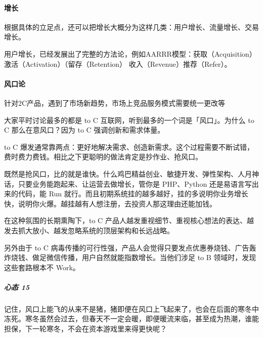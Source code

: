 \documentclass[letterpaper,10pt,english]{sphinxmanual}
\begin{document}
\paragraph{增长}
\label{\detokenize{chapter_introduction/2C:id7}}
根据具体的立足点，还可以把增长大概分为这样几类：用户增长、流量增长、交易增长。

用户增长，已经发展出了完整的方法论，例如AARRR模型：获取（Acquisition）\sphinxhyphen{}
激活（Activation）\sphinxhyphen{}（留存（Retention）\sphinxhyphen{} 收入（Revenue）\sphinxhyphen{}推荐（Refer）。


\paragraph{风口论}
\label{\detokenize{chapter_introduction/2C:id8}}
针对2C产品，遇到了市场新趋势，市场上竞品服务模式需要统一更改等
%
\begin{footnote}[107]\sphinxAtStartFootnote
{}
%
\end{footnote}

大家平时讨论最多的都是 to C 互联网，听到最多的一个词是「风口」。为什么
to C 那么在意风口？因为 to C 强调创新和需求体量。

to C
爆发通常靠两点：更好地解决需求、创造新需求。这个过程需要不断试错，费时费力费钱。相比之下更聪明的做法肯定是抄作业、抢风口。

既然是抢风口，比的就是谁快。什么鸡巴精益创业、敏捷开发、弹性架构、人月神话，只要业务能跑起来、让运营去做增长，管你是
PHP、Python 还是易语言写出来的代码，能 Run
就行。而且初期系统挂的越多越好，挂的多说明你业务增长快，说明你火爆。越挂越有人想注册，去投资人那这理由还能加钱。

在这种氛围的长期熏陶下，to C
产品人越发重视细节、重视核心想法的表达、越发去抓大放小、越发忽略系统的顶层架构和长远战略。

另外由于 to C
病毒传播的可行性强，产品人会觉得只要发点优惠券烧钱、广告轰炸烧钱、做足微信传播，用户自然就能指数增长。当他们涉足
to B 领域时，发现这些套路根本不 Work。


\subparagraph{心态 15\sphinxfootnotemark[108]}
\label{\detokenize{chapter_introduction/2C:id9}}%
\begin{footnotetext}[108]\sphinxAtStartFootnote
{}
%
\end{footnotetext}\ignorespaces 
记住，风口上能飞的从来不是猪，猪即便在风口上飞起来了，也会在后面的寒冬中冻死。寒冬虽然会过去，但春天不一定会暖，即便暖流来临，甚至成为热潮，谁能担保，下一轮寒冬，不会在资本游戏里来得更快呢？
\end{document}
